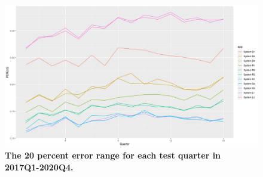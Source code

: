 \begin{figure}[ht]
\begin{center}
\includegraphics[scale=0.4]{./images/per20_16windows}
\caption{{\bf The 20 percent error range for each test quarter in 2017Q1-2020Q4.}\setlength{\baselineskip}{1.25em}}
\label{fig_errors_per20}
\end{center}
\end{figure}